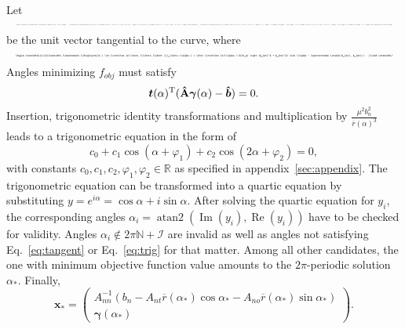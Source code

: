 \documentclass[global,twocolumn]{svjour}
\let\vec\bm
\newcommand{\mat}[1]{{\bf #1}}
\newcommand{\R}{\mathbb{R}}
\newcommand{\dvect}[2]{\ensuremath{\begin{pmatrix}#1\\#2\end{pmatrix}}}
\newcommand{\transp}{{\mathrm{T}}}
\newcommand{\atan}[1]{\operatorname{atan#1}}
\newcommand{\shrinkeqnnew}[2]{\resizebox{#1\linewidth}{!}{\begin{varwidth}[t]{2\linewidth}\ensuremath{\displaystyle{#2}}\end{varwidth}}}
\begin{document}
			Let
			\begin{equation*}
				\shrinkeqnnew{1}{
				\vec t(\alpha)
	= \dvect{\od{}{\beta}\overline{r}(\beta)\sin\beta\sVert[1]_{\beta=\alpha}}{\od{}{\beta}\overline{r}(\beta)\cos\beta\sVert[1]_{\beta=\alpha}}
	= \dvect{\od{\overline{r}(\beta)}{\beta}\sVert[1]_{\beta=\alpha} \cos \alpha - \overline{r}(\alpha) \sin \alpha}{\od{\overline{r}(\beta)}{\beta}\sVert[1]_{\beta=\alpha} \sin \alpha + \overline{r}(\alpha) \cos \alpha}
				}
			\end{equation*}
			be the unit vector tangential to the curve, where
			\begin{equation*}
				\shrinkeqnnew{1}{
				\od{\overline{r}(\beta)}{\beta}\sVert[1]_{\beta=\alpha} = \frac{\overline{r}(\alpha)^2}{b_n} \sqrt{A_{nt}^2 + A_{no}^2} \sin(\alpha - \atan2(A_{no}, A_{nt})).
				}
			\end{equation*}
			Angles minimizing $f_{obj}$ must satisfy
			\begin{equation}
				\vec t(\alpha)^\transp (\mat{\hat{A}} \vec \gamma(\alpha) - \vec{\hat{b}}) = 0.
				\label{eq:tangent}
			\end{equation}
			Insertion, trigonometric identity transformations and
			multiplication by $\frac{\mu^2 b_n^2}{\overline{r}(\alpha)^3}$ leads to
			a trigonometric equation in the form of
			\begin{equation}
				c_0 + c_1 \cos(\alpha + \varphi_1) + c_2 \cos(2\alpha + \varphi_2) = 0,
				\label{eq:trig}
			\end{equation}
			with constants $c_0, c_1, c_2, \varphi_1, \varphi_2 \in \R$ as
			specified in appendix~\ref{sec:appendix}. The trigonometric equation
			can be transformed into a quartic equation by substituting
			$y = e^{i \alpha} = \cos \alpha + i \sin \alpha$. After solving
			the quartic equation for $y_i$, the corresponding angles
			$\alpha_i = \atan2(\operatorname{Im}(y_i), \operatorname{Re}(y_i))$ have to be checked for
			validity. Angles $\alpha_i \not \in 2\pi\mathbb{N}+\mathcal{I}$ are invalid as well as angles not satisfying Eq.~\eqref{eq:tangent} or Eq.~\eqref{eq:trig} for that matter. Among
			all other candidates, the one with minimum objective function value
			amounts to the $2\pi$-periodic solution $\alpha_*$. Finally,
			\begin{equation*}
				\vec x_* = \dvect{A_{nn}^{-1}(b_n - A_{nt} \overline{r}(\alpha_*) \cos \alpha_* - A_{no} \overline{r}(\alpha_*) \sin \alpha_*)}{\vec \gamma(\alpha_*)}.
			\end{equation*}
\end{document}
